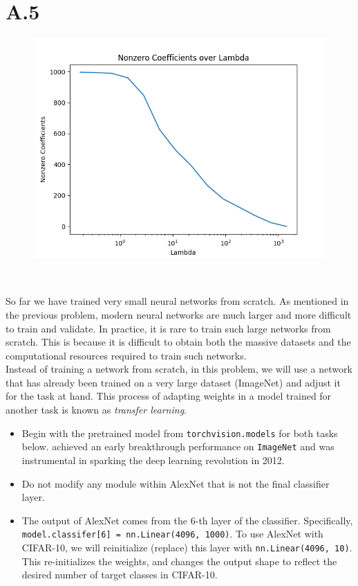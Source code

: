 \documentclass{article}
\newcommand{\1}{\mathbf{1}}
\begin{document}
\section*{A.5}
{\Large 

\begin{figure}[h]
  \centering
  \includegraphics[width=120mm]{../hw2-code/results/a4_a.png}
\end{figure}

 \\

So far we have trained very small neural networks from scratch. As mentioned in the previous problem, modern neural networks are much larger and more difficult to train and validate. In practice, it is rare to train such large networks from scratch. This is because it is difficult to obtain both the massive datasets and the computational resources required to train such networks. \\
 
 Instead of training a network from scratch, in this problem, we will use a network that has already been trained on a very large dataset (ImageNet) and adjust it for the task at hand. This process of adapting weights in a model trained for another task is known as \textit{transfer learning}.
\begin{itemize}
    \item Begin with the pretrained  model from \texttt{torchvision.models} for both tasks below.  achieved an early breakthrough performance on \texttt{ImageNet} and was instrumental in sparking the deep learning revolution in 2012.
    \item Do not modify any module within AlexNet that is not the final classifier layer.
    \item The output of AlexNet comes from the $6$-th layer of the classifier. Specifically, \texttt{model.classifer[6] = nn.Linear(4096, 1000)}. To use AlexNet with CIFAR-10, we will reinitialize (replace) this layer with \texttt{nn.Linear(4096, 10)}. This re-initializes the weights, and changes the output shape to reflect the desired number of target classes in CIFAR-10. 
\end{itemize}

}
\end{document}

